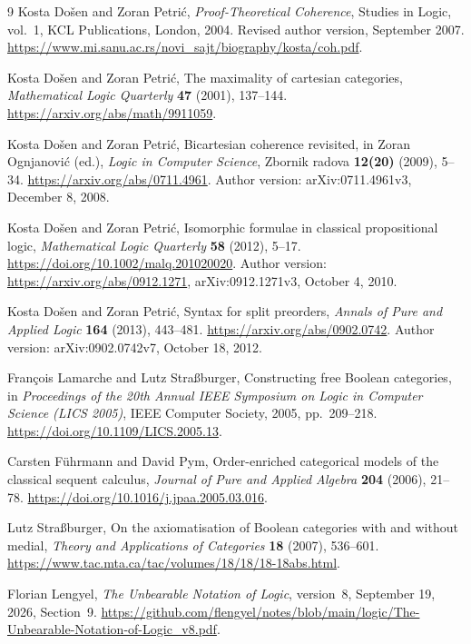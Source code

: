 \documentclass[11pt]{article}
\begin{document}
\begin{thebibliography}{9}
\small
\setlength{\itemsep}{2pt}
\setlength{\parskip}{0pt}
Kosta Do\v{s}en and Zoran Petri\'c,
\emph{Proof-Theoretical Coherence},
Studies in Logic, vol.~1, KCL Publications, London, 2004.
Revised author version, September 2007.
\url{https://www.mi.sanu.ac.rs/novi_sajt/biography/kosta/coh.pdf}.

Kosta Do\v{s}en and Zoran Petri\'c,
The maximality of cartesian categories,
\emph{Mathematical Logic Quarterly} \textbf{47} (2001), 137--144.
\url{https://arxiv.org/abs/math/9911059}.

Kosta Do\v{s}en and Zoran Petri\'c,
Bicartesian coherence revisited,
in Zoran Ognjanovi\'c (ed.), \emph{Logic in Computer Science},
Zbornik radova \textbf{12(20)} (2009), 5--34.
\url{https://arxiv.org/abs/0711.4961}.
Author version: arXiv:0711.4961v3, December 8, 2008.

Kosta Do\v{s}en and Zoran Petri\'c,
Isomorphic formulae in classical propositional logic,
\emph{Mathematical Logic Quarterly} \textbf{58} (2012), 5--17.
\url{https://doi.org/10.1002/malq.201020020}.
Author version: \url{https://arxiv.org/abs/0912.1271},
arXiv:0912.1271v3, October 4, 2010.

Kosta Do\v{s}en and Zoran Petri\'c,
Syntax for split preorders,
\emph{Annals of Pure and Applied Logic} \textbf{164} (2013), 443--481.
\url{https://arxiv.org/abs/0902.0742}.
Author version: arXiv:0902.0742v7, October 18, 2012.

Fran\c{c}ois Lamarche and Lutz Stra{\ss}burger,
Constructing free Boolean categories,
in \emph{Proceedings of the 20th Annual IEEE Symposium on Logic in
Computer Science (LICS 2005)}, IEEE Computer Society, 2005, pp.~209--218.
\url{https://doi.org/10.1109/LICS.2005.13}.

Carsten F\"uhrmann and David Pym,
Order-enriched categorical models of the classical sequent calculus,
\emph{Journal of Pure and Applied Algebra} \textbf{204} (2006), 21--78.
\url{https://doi.org/10.1016/j.jpaa.2005.03.016}.

Lutz Stra{\ss}burger,
On the axiomatisation of Boolean categories with and without medial,
\emph{Theory and Applications of Categories} \textbf{18} (2007),
536--601.
\url{https://www.tac.mta.ca/tac/volumes/18/18/18-18abs.html}.

Florian Lengyel,
\emph{The Unbearable Notation of Logic},
version~8, September 19, 2026, Section~9.
\url{https://github.com/flengyel/notes/blob/main/logic/The-Unbearable-Notation-of-Logic_v8.pdf}.
\end{thebibliography}
\end{document}
